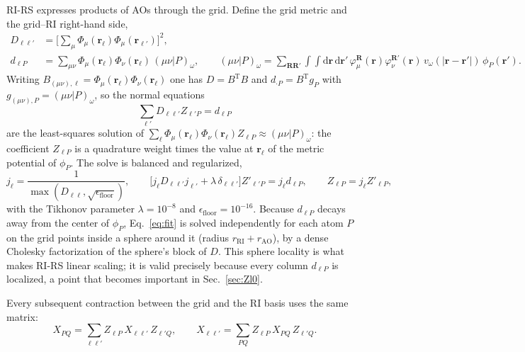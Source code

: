 \documentclass[11pt,a4paper]{article}
\newcommand{\br}{\mathbf{r}}
\newcommand{\bR}{\mathbf{R}}
\newcommand{\dd}{\mathrm{d}}
\newcommand{\Tr}{\mathrm{T}}
\begin{document}
RI-RS expresses products of AOs through the grid. Define the grid metric and the grid--RI
right-hand side,
\begin{align}
  D_{\ell\ell'} &= \Big[\sum_\mu \Phi_\mu(\br_\ell)\Phi_\mu(\br_{\ell'})\Big]^2 ,
  \label{eq:D}\\
  d_{\ell P} &= \sum_{\mu\nu}\Phi_\mu(\br_\ell)\Phi_\nu(\br_\ell)\,(\mu\nu|P)_\omega ,
  \qquad (\mu\nu|P)_\omega = \sum_{\bR\bR'}\!\int\!\!\int\dd\br\,\dd\br'\,
  \varphi_{\mu}^{\bR}(\br)\varphi_{\nu}^{\bR'}(\br)\, v_\omega(|\br-\br'|)\,\phi_P(\br') .
  \label{eq:d}
\end{align}
Writing $B_{(\mu\nu),\ell} = \Phi_\mu(\br_\ell)\Phi_\nu(\br_\ell)$ one has
$D = B^\Tr B$ and $d_{\cdot P} = B^\Tr g_P$ with $g_{(\mu\nu),P} = (\mu\nu|P)_\omega$, so the
normal equations
\begin{equation}
  \sum_{\ell'} D_{\ell\ell'} Z_{\ell' P} = d_{\ell P}
  \label{eq:fit}
\end{equation}
are the least-squares solution of
$\sum_\ell \Phi_\mu(\br_\ell)\Phi_\nu(\br_\ell) Z_{\ell P}\approx (\mu\nu|P)_\omega$: the
coefficient $Z_{\ell P}$ is a quadrature weight times the value at $\br_\ell$ of the metric
potential of $\phi_P$. The solve is balanced and regularized,
\begin{equation}
  j_\ell = \frac{1}{\max(D_{\ell\ell},\sqrt{\epsilon_\mathrm{floor}})},\qquad
  \big[j_\ell D_{\ell\ell'} j_{\ell'} + \lambda\,\delta_{\ell\ell'}\big] Z'_{\ell'P} = j_\ell d_{\ell P},
  \qquad Z_{\ell P} = j_\ell Z'_{\ell P},
  \label{eq:fit_reg}
\end{equation}
with the Tikhonov parameter $\lambda = 10^{-8}$ and $\epsilon_\mathrm{floor}=10^{-16}$.
Because $d_{\ell P}$ decays away from the center of $\phi_P$, Eq.~\eqref{eq:fit} is solved
independently for each atom $P$ on the grid points inside a sphere around it (radius
$r_\mathrm{RI}+r_\mathrm{AO}$), by a dense Cholesky factorization of the sphere's block of
$D$. This sphere locality is what makes RI-RS linear scaling; it is valid precisely because
every column $d_{\ell P}$ is localized, a point that becomes important in Sec.~\ref{sec:Zl0}.

Every subsequent contraction between the grid and the RI basis uses the same matrix:
\begin{equation}
  X_{PQ} = \sum_{\ell\ell'} Z_{\ell P}\, X_{\ell\ell'}\, Z_{\ell' Q},\qquad
  X_{\ell\ell'} = \sum_{PQ} Z_{\ell P}\, X_{PQ}\, Z_{\ell' Q}.
  \label{eq:ZXZ}
\end{equation}
\end{document}
